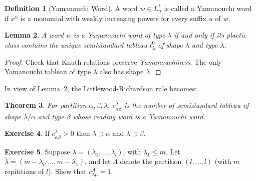 \documentclass[11pt]{amsproc}
\newtheorem{theorem}{Theorem}[subsection]
\newtheorem{lemma}[theorem]{Lemma}
\theoremstyle{definition}
\newtheorem{definition}[theorem]{Definition}
\theoremstyle{example}
\newtheorem{exercise}[theorem]{Exercise}
\begin{document}
\begin{definition}
  [Yamanouchi Word]
  A word $w\in L_n^*$ is called a Yamanouchi word if $x^u$ is a monomial with weakly increasing powers for every suffix $u$ of $w$.
\end{definition}
\begin{lemma}
  \label{lemma:yamanouchi}
  A word $w$ is a Yamanouchi word of type $\lambda$ if and only if its plactic class contains the unique semistandard tableau $t^0_\lambda$ of shape $\lambda$ and type $\lambda$.
\end{lemma}
\begin{proof}
  Check that Knuth relations preserve \emph{Yamanouchiness}.
  The only Yamanouchi tableau of type $\lambda$ also has shape $\lambda$.
\end{proof}
In view of Lemma~\ref{lemma:yamanouchi}, the Littlewood-Richardson rule becomes:
\begin{theorem}
  For partition $\alpha,\beta,\lambda$, $c^\lambda_{\alpha\beta}$ is the number of semistandard tableau of shape $\lambda/\alpha$ and type $\beta$ whose reading word is a Yamanouchi word.
\end{theorem}
\begin{exercise}
  If $c^\lambda_{\alpha\beta}>0$ then $\lambda\supset \alpha$ and $\lambda\supset \beta$.
\end{exercise}
\begin{exercise}
  Suppose $\lambda=(\lambda_1,\dotsc,\lambda_l)$, with $\lambda_1\leq m$.
  Let $\check\lambda=(m-\lambda_l,\dotsc,m-\lambda_1)$, and let $\Lambda$ denote the partition $(l,\dotsc,l)$ (with $m$ repititions of $l$).
  Show that $c^\Lambda_{\lambda\mu}=1$.
\end{exercise}
\end{document}

